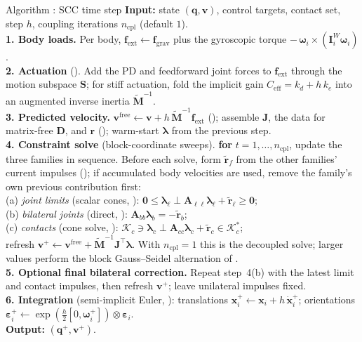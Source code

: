 \documentclass{article}
\newcounter{algctr}
\newcommand{\algcaption}[2]{\refstepcounter{algctr}\label{#2}Algorithm \thealgctr: #1}
\newcommand{\M}{\mathbf{M}}
\newcommand{\Jac}{\mathbf{J}}
\newcommand{\Del}{\mathbf{D}}         %
\newcommand{\Aop}{\mathbf{A}}         %
\newcommand{\vv}{\mathbf{v}}
\newcommand{\vfree}{\mathbf{v}^{\mathrm{free}}}
\newcommand{\fext}{\mathbf{f}_{\mathrm{ext}}}
\newcommand{\blam}{\boldsymbol{\lambda}}
\newcommand{\rhs}{\mathbf{r}}
\newcommand{\Kadm}{\mathcal{K}}          %
\theoremstyle{plain}
\theoremstyle{definition}
\begin{document}
\begin{algo}{\algcaption{SCC time step}{alg:step}}
\textbf{Input:} state $(\mathbf q,\vv)$, control targets, contact set, step $h$,
coupling iterations $n_{\mathrm{cpl}}$ (default $1$).\\
\textbf{1. Body loads.} Per body, $\fext\leftarrow\mathbf f_{\mathrm{grav}}$ plus
the gyroscopic torque $-\,\boldsymbol\omega_i\times(\mathbf I_i^W\boldsymbol\omega_i)$.\\
\textbf{2. Actuation} (). Add the PD and feedforward
joint forces to $\fext$ through the motion subspace $\mathbf S$; for stiff
actuation, fold the implicit gain $C_{\mathrm{eff}}=k_d+h\,k_e$ into an augmented
inverse inertia $\widetilde{\M}^{-1}$.\\
\textbf{3. Predicted velocity.} $\vfree\leftarrow\vv+h\,\widetilde{\M}^{-1}\fext$
(); assemble $\Jac$, the data for matrix-free $\Del$, and $\rhs$
(); warm-start $\blam$ from the previous step.\\
\textbf{4. Constraint solve} (block-coordinate sweeps). \textbf{for}
$t=1,\dots,n_{\mathrm{cpl}}$, update the three families in sequence.
Before each solve, form $\widetilde{\rhs}_f$ from the other families' current
impulses (); if accumulated body velocities are used,
remove the family's own previous contribution first:\\
\quad (a) \emph{joint limits} (scalar cones, ):
        $\mathbf0\le\blam_\ell\perp
        \Aop_{\ell\ell}\blam_\ell+\widetilde{\rhs}_\ell\ge\mathbf0$;\\
\quad (b) \emph{bilateral joints} (direct, ):
        $\Aop_{bb}\blam_b=-\widetilde{\rhs}_b$;\\
\quad (c) \emph{contacts} (cone solve, ):
        $\Kadm_c\ni\blam_c\perp\Aop_{cc}\blam_c+
        \widetilde{\rhs}_c\in\Kadm_c^*$;\\
\quad refresh $\vv^{+}\leftarrow\vfree+\widetilde{\M}^{-1}\Jac^{\top}\blam$.
With $n_{\mathrm{cpl}}=1$ this is the decoupled solve; larger values perform the
block Gauss--Seidel alternation of .\\
\textbf{5. Optional final bilateral correction.} Repeat step~4(b) with the
latest limit and contact impulses, then refresh $\vv^+$; leave unilateral
impulses fixed.\\
\textbf{6. Integration} (semi-implicit Euler, ): translations
$\mathbf x_i^{+}\leftarrow\mathbf x_i+h\,\dot{\mathbf x}_i^{+}$; orientations
$\boldsymbol\varepsilon_i^{+}\leftarrow
\exp(\tfrac{h}{2}[0,\boldsymbol\omega_i^{+}])\otimes\boldsymbol\varepsilon_i$.\\
\textbf{Output:} $(\mathbf q^{+},\vv^{+})$.
\end{algo}
\end{document}
